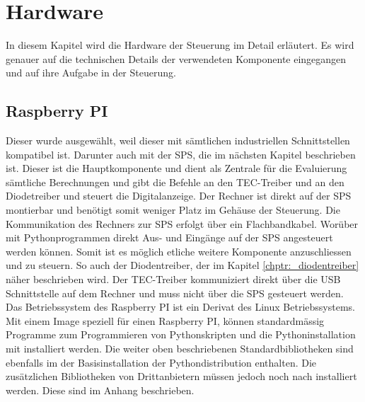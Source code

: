 \section{Hardware}
In diesem Kapitel wird die Hardware der Steuerung im Detail erläutert. Es wird genauer auf die technischen Details der verwendeten Komponente eingegangen und auf ihre Aufgabe in der Steuerung.


\subsection{Raspberry PI}
Dieser wurde ausgewählt, weil dieser mit sämtlichen industriellen Schnittstellen kompatibel ist. Darunter auch mit der SPS, die im nächsten Kapitel beschrieben ist. Dieser ist die Hauptkomponente und dient als Zentrale für die Evaluierung sämtliche Berechnungen und gibt die Befehle an den TEC-Treiber und an den Diodetreiber und steuert die Digitalanzeige. Der Rechner ist direkt auf der SPS montierbar und benötigt somit weniger Platz im Gehäuse der Steuerung. Die Kommunikation des Rechners zur SPS erfolgt über ein Flachbandkabel. Worüber mit Pythonprogrammen direkt Aus- und Eingänge auf der SPS angesteuert werden können. Somit ist es möglich etliche weitere Komponente anzuschliessen und zu steuern. So auch der Diodentreiber, der im Kapitel \ref{chptr:_diodentreiber} näher beschrieben wird. Der TEC-Treiber kommuniziert direkt über die USB Schnittstelle auf dem Rechner und muss nicht über die SPS gesteuert werden.\\
Das Betriebssystem des Raspberry PI ist ein Derivat des Linux Betriebssystems. Mit einem Image speziell für einen Raspberry PI, können standardmässig Programme zum Programmieren von Pythonskripten und die Pythoninstallation mit installiert werden. Die weiter oben beschriebenen Standardbibliotheken sind ebenfalls im der Basisinstallation der Pythondistribution enthalten. Die zusätzlichen Bibliotheken von Drittanbietern müssen jedoch noch nach installiert werden. Diese sind im Anhang beschrieben.


